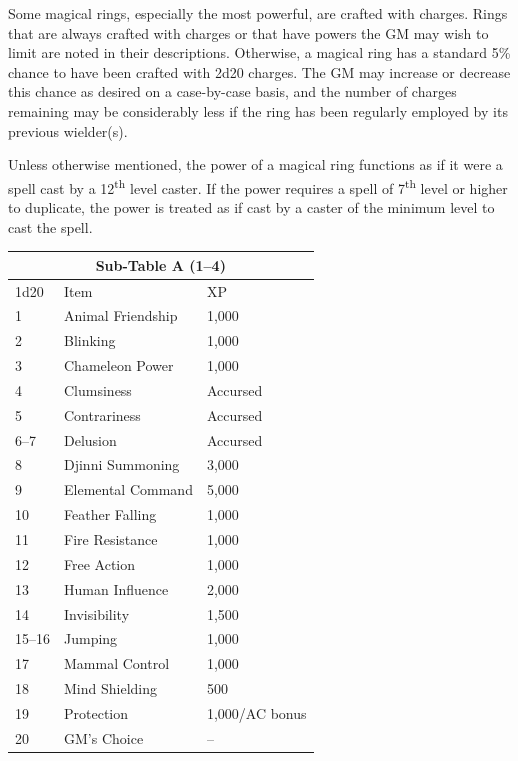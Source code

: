 \begin{multicols}{2}
Some magical rings, especially the most powerful, are crafted with charges.  Rings that are always crafted with charges or that have powers the GM may wish to limit are noted in their descriptions.  Otherwise, a magical ring has a standard 5\% chance to have been crafted with 2d20 charges.  The GM may increase or decrease this chance as desired on a case-by-case basis, and the number of charges remaining may be considerably less if the ring has been regularly employed by its previous wielder(s).  

Unless otherwise mentioned, the power of a magical ring functions as if it were a spell cast by a 12\textsuperscript{th} level caster.  If the power requires a spell of 7\textsuperscript{th} level or higher to duplicate, the power is treated as if cast by a caster of the minimum level to cast the spell.  

\noindent
\begin{minipage}{\columnwidth}

\label{ringsa}
\noindent
\begin{tabular}{|p{}|p{}|p{}|}
\multicolumn{3}{c}{Sub-Table A (1--4)} \\
\hline
1d20	& Item	& XP \\
\hline\hline
\rowcolor[gray]{.9}1	& Animal Friendship	& 1,000 \\
2	& Blinking	& 1,000 \\
\rowcolor[gray]{.9}3	& Chameleon Power	& 1,000 \\
4	& Clumsiness	& Accursed \\
\rowcolor[gray]{.9}5	& Contrariness	& Accursed \\
6--7	& Delusion	& Accursed \\
\rowcolor[gray]{.9}8	& Djinni Summoning	& 3,000 \\
9	& Elemental Command	& 5,000 \\
\rowcolor[gray]{.9}10	& Feather Falling	& 1,000 \\
11	& Fire Resistance	& 1,000 \\
\rowcolor[gray]{.9}12	& Free Action	& 1,000 \\
13	& Human Influence	& 2,000 \\
\rowcolor[gray]{.9}14	& Invisibility	& 1,500 \\
15--16	& Jumping	& 1,000 \\
\rowcolor[gray]{.9}17	& Mammal Control	& 1,000 \\
18	& Mind Shielding	& 500 \\
\rowcolor[gray]{.9}19	& Protection	& 1,000/AC bonus \\
20	& GM's Choice	& -- \\
\hline
\end{tabular}


\end{minipage}
\end{multicols}
